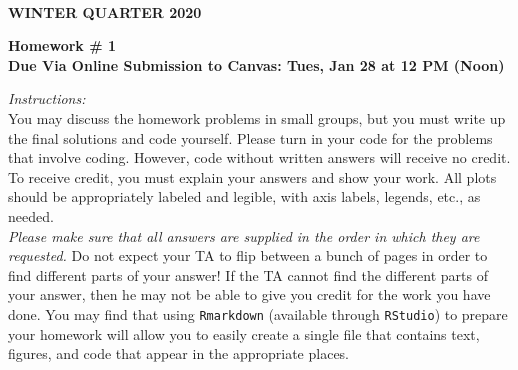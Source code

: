 \documentclass[12pt]{article}
\begin{document}
\\
{\bf WINTER QUARTER 2020}\\


\vspace{5mm}

\begin{center}
{\bf Homework \# 1}\\
{\bf Due Via Online Submission to Canvas: Tues, Jan 28 at 12 PM (Noon) }
\end{center}
\vspace{10mm}

\noindent \emph{Instructions:}\\

 You may discuss the homework problems in small groups, but you must write up the final solutions and code yourself. 
Please turn in your code for the problems that involve coding.  However, code without written answers will receive no credit. To receive credit, you must explain your answers and show your work. All plots should be appropriately labeled and legible, with axis labels, legends, etc., as needed. \\

\emph{Please make sure that all answers are supplied in the order in which they are requested.} Do not expect your TA to flip between a bunch of  pages in order to find different parts of your answer!  
If the TA cannot find the different parts of your answer, then he may not be able to give you credit for the work you have done. You may find that using \verb=Rmarkdown= (available through \verb=RStudio=) to prepare your homework will allow you to easily create a single file that contains text, figures, and code that appear in the appropriate places. 

\vspace{10mm}
\end{document}
